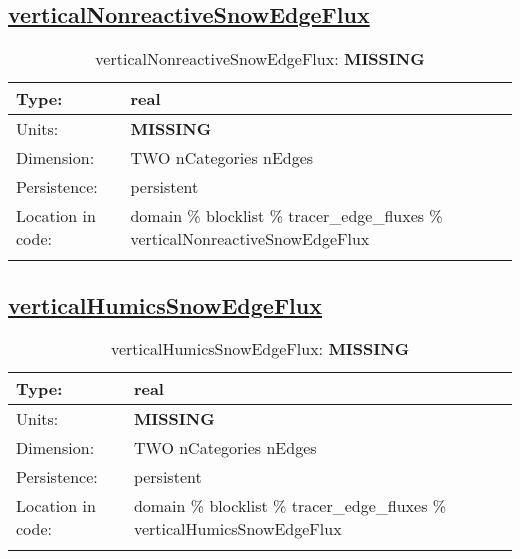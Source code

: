 \subsection[verticalNonreactiveSnowEdgeFlux]{\hyperref[sec:var_tab_tracer_edge_fluxes]{verticalNonreactiveSnowEdgeFlux}}
\label{subsec:var_sec_tracer_edge_fluxes_verticalNonreactiveSnowEdgeFlux}
\begin{center}
\begin{longtable}{| p{2.0in} | p{4.0in} |}
        \hline 
        Type: & real \\
        \hline 
        Units: & {\bf \color{red} MISSING} \\
        \hline 
        Dimension: & TWO nCategories nEdges \\
        \hline 
        Persistence: & persistent \\
        \hline 
         Location in code: & domain \% blocklist \% tracer\_edge\_fluxes \% verticalNonreactiveSnowEdgeFlux \\
         \hline 
    \caption{verticalNonreactiveSnowEdgeFlux: {\bf \color{red} MISSING}}
\end{longtable}
\end{center}
\subsection[verticalHumicsSnowEdgeFlux]{\hyperref[sec:var_tab_tracer_edge_fluxes]{verticalHumicsSnowEdgeFlux}}
\label{subsec:var_sec_tracer_edge_fluxes_verticalHumicsSnowEdgeFlux}
\begin{center}
\begin{longtable}{| p{2.0in} | p{4.0in} |}
        \hline 
        Type: & real \\
        \hline 
        Units: & {\bf \color{red} MISSING} \\
        \hline 
        Dimension: & TWO nCategories nEdges \\
        \hline 
        Persistence: & persistent \\
        \hline 
         Location in code: & domain \% blocklist \% tracer\_edge\_fluxes \% verticalHumicsSnowEdgeFlux \\
         \hline 
    \caption{verticalHumicsSnowEdgeFlux: {\bf \color{red} MISSING}}
\end{longtable}
\end{center}
